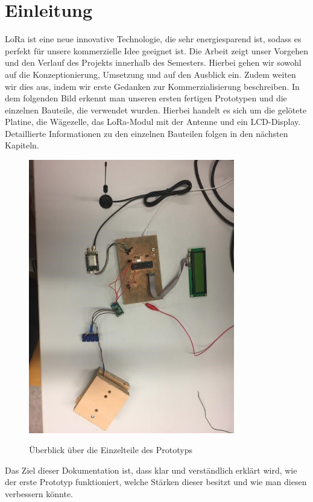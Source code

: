 





\thispagestyle{plain}
\section*{Einleitung}
LoRa ist eine neue innovative Technologie, die sehr energiesparend ist, sodass es perfekt für unsere kommerzielle Idee geeignet ist. 
Die Arbeit zeigt unser Vorgehen und den Verlauf des Projekts innerhalb des Semesters. Hierbei gehen wir sowohl auf die Konzeptionierung, Umsetzung und auf den Ausblick ein. Zudem weiten wir dies aus, indem wir erste Gedanken zur Kommerzialisierung beschreiben. 
In dem folgenden Bild erkennt man unseren ersten fertigen Prototypen und die einzelnen Bauteile, die verwendet wurden. Hierbei handelt es sich um die gelötete Platine, die Wägezelle, das LoRa-Modul mit der Antenne und ein LCD-Display. Detaillierte Informationen zu den einzelnen Bauteilen folgen in den nächsten Kapiteln.
\begin{figure}[H]
    \center
    \includegraphics[width=9cm]{Bilder/einleitung.jpg}\\
    \caption{Überblick über die Einzelteile des Prototyps}
    \label{fig:Einleitung}
\end{figure}
\noindent 
Das Ziel dieser Dokumentation ist, dass klar und verständlich erklärt wird, wie der erste Prototyp funktioniert, welche Stärken dieser besitzt und wie man diesen verbessern könnte. 
\newpage

